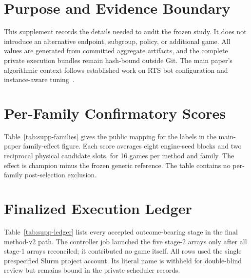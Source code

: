 \section{Purpose and Evidence Boundary}

This supplement records the details needed to audit the frozen study. It does
not introduce an alternative endpoint, subgroup, policy, or additional game.
All values are generated from committed aggregate artifacts, and the complete
private execution bundles remain hash-bound outside Git. The main paper's
algorithmic context follows established work on RTS bot configuration and
instance-aware tuning~\cite{mora2012noisy,fernandezAres2012map,eggensperger2019pitfalls}.

\section{Per-Family Confirmatory Scores}

Table~\ref{tab:supp-families} gives the public mapping for the labels in the
main-paper family-effect figure. Each score averages eight engine-seed blocks
and two reciprocal physical candidate slots, for 16 games per method and
family. The effect is champion minus the frozen generic reference. The table contains no
per-family post-selection exclusion.

\begin{table}[ht]
\centering
\caption{Complete sealed-family result, ordered by effect.}
\label{tab:supp-families}
\scriptsize
\resizebox{\textwidth}{!}{}
\end{table}

\section{Finalized Execution Ledger}

Table~\ref{tab:supp-ledger} lists every accepted outcome-bearing stage in the
final method-v2 path. The controller job launched the five stage-2 arrays only
after all stage-1 arrays reconciled; it contributed no game itself. All rows
used the single prespecified Slurm project account. Its literal name is withheld
for double-blind review but remains bound in the private scheduler records.


